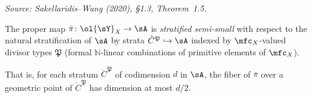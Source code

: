 \begin{theorem}
  \label{thm:semismall}
  \textit{Source: Sakellaridis--Wang (2020), §1.3, Theorem~1.5.}

  The proper map \( \bar\pi \colon \ol{\sY}_X \to \sA \) is \emph{stratified semi-small}
  with respect to the natural stratification of \( \sA \) by strata
  \( \mathring{C}^{\mathfrak{P}} \hookrightarrow \sA \)
  indexed by \( \mfc_X \)-valued divisor types \( \mathfrak{P} \)
  (formal \( \mathbb{N} \)-linear combinations of primitive elements of \( \mfc_X \)).

  That is, for each stratum \( \mathring{C}^{\mathfrak{P}} \) of codimension \( d \) in
  \( \sA \), the fiber of \( \bar\pi \) over a geometric point of
  \( \mathring{C}^{\mathfrak{P}} \) has dimension at most \( d/2 \).
\end{theorem}

